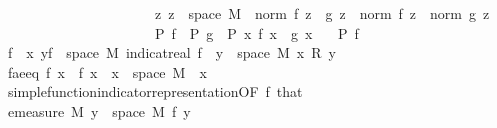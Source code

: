 \begin{isabellebody}
\ \ \ \ \ \ \ \ \ \ \ \ \ \ \ \ \ \ \ \ \ \ {\isacharparenleft}{\kern0pt}{\isasymAnd}z{\isachardot}{\kern0pt}\ z\ {\isasymin}\ space\ M\ {\isasymLongrightarrow}\ norm\ {\isacharparenleft}{\kern0pt}f\ z\ {\isacharplus}{\kern0pt}\ g\ z{\isacharparenright}{\kern0pt}\ {\isacharequal}{\kern0pt}\ norm\ {\isacharparenleft}{\kern0pt}f\ z{\isacharparenright}{\kern0pt}\ {\isacharplus}{\kern0pt}\ norm\ {\isacharparenleft}{\kern0pt}g\ z{\isacharparenright}{\kern0pt}{\isacharparenright}{\kern0pt}\ {\isasymLongrightarrow}\isanewline
\ \ \ \ \ \ \ \ \ \ \ \ \ \ \ \ \ \ \ \ \ \ P\ f\ {\isasymLongrightarrow}\ P\ g\ {\isasymLongrightarrow}\ P\ {\isacharparenleft}{\kern0pt}{\isasymlambda}x{\isachardot}{\kern0pt}\ f\ x\ {\isacharplus}{\kern0pt}\ g\ x{\isacharparenright}{\kern0pt}{\isachardoublequoteclose}\isanewline
\ \ \ {\isachardoublequoteopen}P\ f{\isachardoublequoteclose}%
\endisatagimportant
{\isafoldimportant}%
%
\isadelimimportant
%
\endisadelimimportant
\isanewline
%
\isadelimproof
%
\endisadelimproof
%
\isatagproof
{}\isamarkupfalse%
{\isacharminus}{\kern0pt}\isanewline
\ \ \isamarkupfalse%
\ {\isacharquery}{\kern0pt}f\ {\isacharequal}{\kern0pt}\ {\isachardoublequoteopen}{\isasymlambda}x{\isachardot}{\kern0pt}\ {\isacharparenleft}{\kern0pt}{\isasymSum}y{\isasymin}f\ {\isacharbackquote}{\kern0pt}\ space\ M{\isachardot}{\kern0pt}\ indicat{\isacharunderscore}{\kern0pt}real\ {\isacharparenleft}{\kern0pt}f\ {\isacharminus}{\kern0pt}{\isacharbackquote}{\kern0pt}\ {\isacharbraceleft}{\kern0pt}y{\isacharbraceright}{\kern0pt}\ {\isasyminter}\ space\ M{\isacharparenright}{\kern0pt}\ x\ {\isacharasterisk}{\kern0pt}\isactrlsub R\ y{\isacharparenright}{\kern0pt}{\isachardoublequoteclose}\isanewline
\ \ \isamarkupfalse%
\ f{\isacharunderscore}{\kern0pt}ae{\isacharunderscore}{\kern0pt}eq{\isacharcolon}{\kern0pt}\ {\isachardoublequoteopen}f\ x\ {\isacharequal}{\kern0pt}\ {\isacharquery}{\kern0pt}f\ x{\isachardoublequoteclose}\ \ {\isachardoublequoteopen}x\ {\isasymin}\ space\ M{\isachardoublequoteclose}\ \ x\ \isamarkupfalse%
\ simple{\isacharunderscore}{\kern0pt}function{\isacharunderscore}{\kern0pt}indicator{\isacharunderscore}{\kern0pt}representation{\isacharbrackleft}{\kern0pt}OF\ f{\isacharparenleft}{\kern0pt}{}{\isacharparenright}{\kern0pt}\ that{\isacharbrackright}{\kern0pt}\ \isacommand{{\isachardot}{\kern0pt}}\isamarkupfalse%
\isanewline
\ \ \isamarkupfalse%
\ \isamarkupfalse%
\ {\isachardoublequoteopen}emeasure\ M\ {\isacharbraceleft}{\kern0pt}y\ {\isasymin}\ space\ M{\isachardot}{\kern0pt}\ {\isacharquery}{\kern0pt}f\ y\ {\isasymnoteq}\ {}{\isacharbraceright}{\kern0pt}\ {\isasymnoteq}\ {\isasyminfinity}{\isachardoublequoteclose}\ \isamarkupfalse%

\end{isabellebody}
